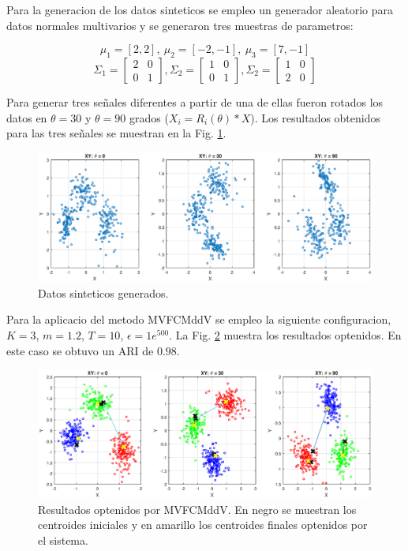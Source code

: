 \documentclass[12pt]{article}
\begin{document}
Para la generacion de los datos sinteticos se empleo un generador aleatorio para datos normales multivarios y se generaron tres muestras de parametros: 

$$\mu_1 = [2, 2], \ \mu_2 = [-2, -1], \ \mu_3 = [7, -1] $$
$$\Sigma_1 = \left[ \begin{matrix}
2 & 0 \\ 
0 & 1
\end{matrix} \right], 
\Sigma_2 = \left[ \begin{matrix}
1 & 0 \\ 
0 & 1
\end{matrix} \right], 
\Sigma_2 = \left[ \begin{matrix}
1 & 0 \\ 
2 & 0
\end{matrix} \right] $$

Para generar tres señales diferentes a partir de una de ellas fueron rotados los datos en $\theta = 30$ y $\theta = 90$ grados ($X_i = R_i(\theta)*X$). Los resultados obtenidos para las tres señales se muestran en la Fig. \ref{fig:xy_sinteticos}.

\begin{figure}[h]
\centering
\includegraphics[width=4.5in]{../out/xy-sinteticos.eps}
\caption{Datos sinteticos generados.}
\label{fig:xy_sinteticos}
\end{figure}  

Para la aplicacio del metodo MVFCMddV se empleo la siguiente configuracion, $K = 3$, $m = 1.2$, $T = 10$, $\epsilon = 1e^{500}$. La Fig. \ref{fig:cluster_datos_sinteticos} muestra los resultados optenidos. En este caso se obtuvo un ARI de $0.98$.


\begin{figure}[h]
\centering
\includegraphics[width=4.5in]{../out/clusters-gauss-3.eps}
\caption{Resultados optenidos por MVFCMddV. En negro se muestran los centroides iniciales y en amarillo los centroides finales optenidos por el sistema.}
\label{fig:cluster_datos_sinteticos}
\end{figure}  
\end{document}

